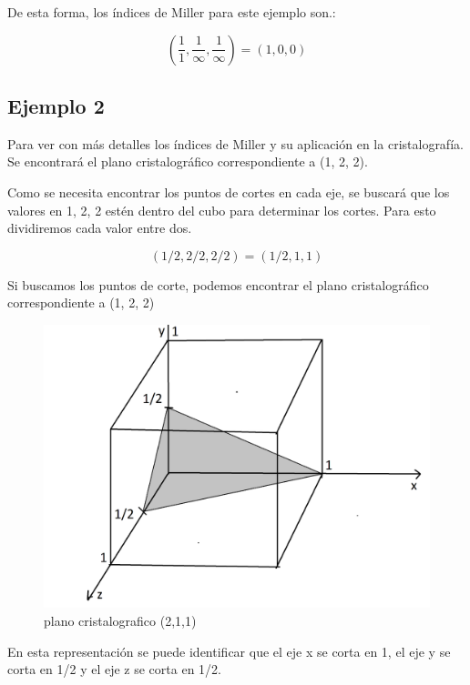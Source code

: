 \documentclass[12pt,a4paper]{article}
\begin{document}
De esta forma, los índices de Miller para este ejemplo son.:

\begin{equation*}
    \left( \frac{1}{1},\frac{1}{\infty},\frac{1}{\infty} \right) =  (1, 0, 0)
\end{equation*}

\subsection{Ejemplo 2}
Para ver con más detalles los índices de Miller y su aplicación en la cristalografía. Se encontrará el plano cristalográfico correspondiente a  (1, 2, 2).

Como se necesita encontrar los puntos de cortes en cada eje, se buscará que los valores en 1, 2, 2 estén dentro del cubo para determinar los cortes. Para esto dividiremos cada valor entre dos. 

\begin{equation*}
(1/2, 2/2, 2/2) = (1/2, 1, 1)
\end{equation*}

Si buscamos los puntos de corte, podemos encontrar el plano cristalográfico correspondiente a (1, 2, 2)

\begin{figure}[H]
	\centering
		\includegraphics[scale=0.5]{5.png}
	\caption{plano cristalografico (2,1,1)}
\end{figure}


\vspace{\baselineskip}
En esta representación se puede identificar que el eje x se corta en 1, el eje y se corta en 1/2 y el eje z se corta en 1/2. 
\end{document}
